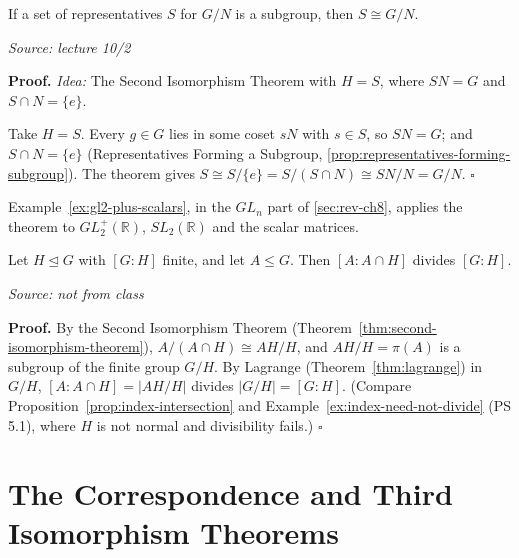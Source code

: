 \documentclass[11pt]{report}
\renewenvironment{proof}[1][Proof]{\noindent\textbf{#1.} }{\hfill$\square$\par\vspace{5pt}}
\newcommand{\srcline}[1]{\par\hfill{\footnotesize\textit{Source: #1}}}
\begin{document}
\begin{corbox}\label{cor:subgroup-representatives-again}
If a set of representatives $S$ for $G/N$ is a subgroup, then $S \cong G/N$.
\srcline{lecture 10/2}
\end{corbox}

\begin{proof}
\textit{Idea:} The Second Isomorphism Theorem with $H = S$, where $SN = G$ and $S \cap N = \{e\}$.\par
Take $H = S$. Every $g \in G$ lies in some coset $sN$ with $s \in S$, so $SN = G$; and $S \cap N = \{e\}$ (Representatives Forming a Subgroup, \ref{prop:representatives-forming-subgroup}). The theorem gives $S \cong S/\{e\} = S/(S \cap N) \cong SN/N = G/N$.
\end{proof}

Example~\ref{ex:gl2-plus-scalars}, in the $GL_n$ part of \ref{sec:rev-ch8}, applies the theorem to $GL_2^+(\mathbb{R})$, $SL_2(\mathbb{R})$ and the scalar matrices.

\begin{corbox}\label{cor:index-intersection-normal}
Let $H \trianglelefteq G$ with $[G : H]$ finite, and let $A \leq G$. Then $[A : A \cap H]$ divides $[G : H]$.
\srcline{not from class}
\end{corbox}

\begin{proof}
By the Second Isomorphism Theorem (Theorem~\ref{thm:second-isomorphism-theorem}), $A/(A \cap H) \cong AH/H$, and $AH/H = \pi(A)$ is a subgroup of the finite group $G/H$. By Lagrange (Theorem~\ref{thm:lagrange}) in $G/H$, $[A : A \cap H] = |AH/H|$ divides $|G/H| = [G : H]$. (Compare Proposition~\ref{prop:index-intersection} and Example~\ref{ex:index-need-not-divide} (PS 5.1), where $H$ is not normal and divisibility fails.)
\end{proof}


\section{The Correspondence and Third Isomorphism Theorems}\label{sec:second-iso}
\end{document}
